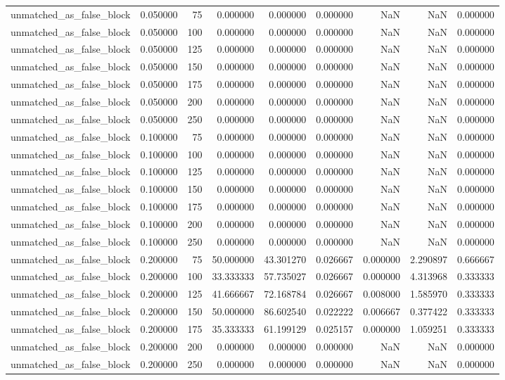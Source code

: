 \begin{tabular}{lrrrrrrrr}
unmatched_as_false_block & 0.050000 & 75 & 0.000000 & 0.000000 & 0.000000 & NaN & NaN & 0.000000 \\
unmatched_as_false_block & 0.050000 & 100 & 0.000000 & 0.000000 & 0.000000 & NaN & NaN & 0.000000 \\
unmatched_as_false_block & 0.050000 & 125 & 0.000000 & 0.000000 & 0.000000 & NaN & NaN & 0.000000 \\
unmatched_as_false_block & 0.050000 & 150 & 0.000000 & 0.000000 & 0.000000 & NaN & NaN & 0.000000 \\
unmatched_as_false_block & 0.050000 & 175 & 0.000000 & 0.000000 & 0.000000 & NaN & NaN & 0.000000 \\
unmatched_as_false_block & 0.050000 & 200 & 0.000000 & 0.000000 & 0.000000 & NaN & NaN & 0.000000 \\
unmatched_as_false_block & 0.050000 & 250 & 0.000000 & 0.000000 & 0.000000 & NaN & NaN & 0.000000 \\
unmatched_as_false_block & 0.100000 & 75 & 0.000000 & 0.000000 & 0.000000 & NaN & NaN & 0.000000 \\
unmatched_as_false_block & 0.100000 & 100 & 0.000000 & 0.000000 & 0.000000 & NaN & NaN & 0.000000 \\
unmatched_as_false_block & 0.100000 & 125 & 0.000000 & 0.000000 & 0.000000 & NaN & NaN & 0.000000 \\
unmatched_as_false_block & 0.100000 & 150 & 0.000000 & 0.000000 & 0.000000 & NaN & NaN & 0.000000 \\
unmatched_as_false_block & 0.100000 & 175 & 0.000000 & 0.000000 & 0.000000 & NaN & NaN & 0.000000 \\
unmatched_as_false_block & 0.100000 & 200 & 0.000000 & 0.000000 & 0.000000 & NaN & NaN & 0.000000 \\
unmatched_as_false_block & 0.100000 & 250 & 0.000000 & 0.000000 & 0.000000 & NaN & NaN & 0.000000 \\
unmatched_as_false_block & 0.200000 & 75 & 50.000000 & 43.301270 & 0.026667 & 0.000000 & 2.290897 & 0.666667 \\
unmatched_as_false_block & 0.200000 & 100 & 33.333333 & 57.735027 & 0.026667 & 0.000000 & 4.313968 & 0.333333 \\
unmatched_as_false_block & 0.200000 & 125 & 41.666667 & 72.168784 & 0.026667 & 0.008000 & 1.585970 & 0.333333 \\
unmatched_as_false_block & 0.200000 & 150 & 50.000000 & 86.602540 & 0.022222 & 0.006667 & 0.377422 & 0.333333 \\
unmatched_as_false_block & 0.200000 & 175 & 35.333333 & 61.199129 & 0.025157 & 0.000000 & 1.059251 & 0.333333 \\
unmatched_as_false_block & 0.200000 & 200 & 0.000000 & 0.000000 & 0.000000 & NaN & NaN & 0.000000 \\
unmatched_as_false_block & 0.200000 & 250 & 0.000000 & 0.000000 & 0.000000 & NaN & NaN & 0.000000 \\
\bottomrule
\end{tabular}
